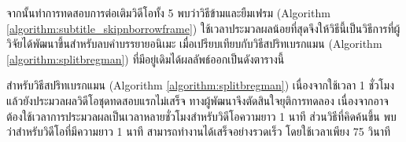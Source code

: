 

		
\hspace{1cm}  จากนั้นทำการทดสอบการต่อเติมวิดีโอทั้ง 5 พบว่าวิธีข้ามและยืมเฟรม (Algorithm \ref{algorithm:subtitle_skipnborrowframe}) ใช้เวลาประมวลผลน้อยที่สุดจึงให้วิธีนี้เป็นวิธีการที่ผู้วิจัยได้พัฒนาขึ้นสำหรับลบคำบรรยายอนิเมะ เมื่อเปรียบเทียบกับวิธีสปริทเบรกแมน (Algorithm \ref{algorithm:splitbregman}) ที่มีอยู่เดิมได้ผลลัพธ์ออกเป็นดังตารางนี้



\hspace{1cm} สำหรับวิธีสปริทเบรกแมน (Algorithm \ref{algorithm:splitbregman}) เนื่องจากใช้เวลา 1 ชั่วโมงแล้วยังประมวลผลวิดีโอชุดทดสอบแรกไม่เสร็จ ทางผู้พัฒนาจึงตัดสินใจยุติการทดลอง เนื่องจากอาจต้องใช้เวลาการประมวลผลเป็นเวลาหลายชั่วโมงสำหรับวิดีโอความยาว 1 นาที ส่วนวิธีที่คิดค้นขึ้น พบว่าสำหรับวิดีโอที่มีความยาว 1 นาที สามารถทำงานได้เสร็จอย่างรวดเร็ว โดยใช้เวลาเพียง 75 วินาที